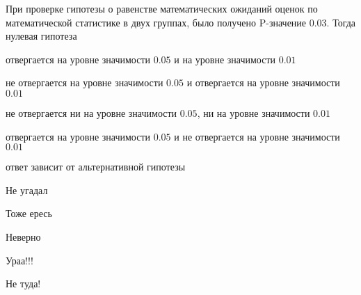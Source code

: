 
\begin{question}
При проверке гипотезы о равенстве математических ожиданий оценок по
математической статистике в двух группах, было получено P-значение 0.03.
Тогда нулевая гипотеза
\begin{answerlist}
  \item отвергается на уровне значимости \(0.05\) и на уровне значимости
\(0.01\)
  \item не отвергается на уровне значимости \(0.05\) и отвергается на уровне
значимости \(0.01\)
  \item не отвергается ни на уровне значимости \(0.05\), ни на уровне значимости
\(0.01\)
  \item отвергается на уровне значимости \(0.05\) и не отвергается на уровне
значимости \(0.01\)
  \item ответ зависит от альтернативной гипотезы
\end{answerlist}
\end{question}

\begin{solution}
\begin{answerlist}
  \item Не угадал
  \item Тоже ересь
  \item Неверно
  \item Ураа!!!
  \item Не туда!
\end{answerlist}
\end{solution}

